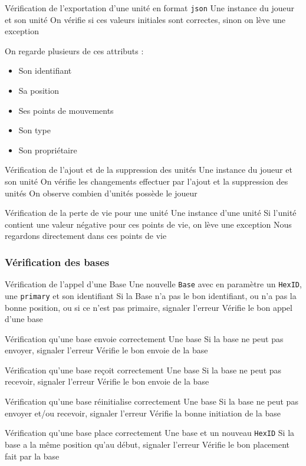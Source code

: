 \mytest
{Vérification de l'exportation d'une unité en format \texttt{json}}
{Une instance du joueur et son unité}
{On vérifie si ces valeurs initiales sont correctes, sinon on lève une exception}
{
    On regarde plusieurs de ces attributs :
    \begin{itemize}
        \item Son identifiant
        \item Sa position
        \item Ses points de mouvements
        \item Son type
        \item Son propriétaire
    \end{itemize}
}

\mytest
{Vérification de l'ajout et de la suppression des unités}
{Une instance du joueur et son unité}
{On vérifie les changements effectuer par l'ajout et la suppression des unités}
{On observe combien d'unités possède le joueur}

\mytest
{Vérification de la perte de vie pour une unité}
{Une instance d'une unité}
{Si l'unité contient une valeur négative pour ces points de vie, on lève une exception}
{Nous regardons directement dans ces points de vie}

\subsubsection{Vérification des bases}

\mytest
{Vérification de l'appel d'une Base}
{Une nouvelle {\tt Base} avec en paramètre un {\tt HexID}, une {\tt primary} et son identifiant }
{Si la Base n'a pas le bon identifiant, ou n'a pas la bonne position, ou si ce n'est pas primaire, signaler l'erreur }
{Vérifie le bon appel d'une base}

\mytest
{Vérification qu'une base envoie correctement}
{Une base}
{Si la base ne peut pas envoyer,  signaler l'erreur }
{Vérifie le bon envoie de la base }

\mytest
{Vérification qu'une base reçoit correctement}
{Une base}
{Si la base ne peut pas recevoir,  signaler l'erreur }
{Vérifie le bon envoie de la base }

\mytest
{Vérification qu'une base réinitialise correctement}
{Une base}
{Si la base ne peut pas envoyer et/ou recevoir,  signaler l'erreur }
{Vérifie la bonne initiation de la base }

\mytest
{Vérification qu'une base place correctement}
{Une base et un nouveau {\tt HexID}}
{Si la base a la même position qu'au début,  signaler l'erreur }
{Vérifie le bon placement fait par la  base }


